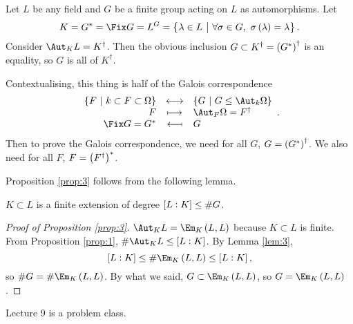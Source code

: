 \begin{proposition}
\label{prop:3}
Let $ L $ be any field and $ G $ be a finite group acting on $ L $ as automorphisms. Let
$$ K = G^* = \Fix G = L^G = \cbr{\lambda \in L \st \forall \sigma \in G, \ \sigma\br{\lambda} = \lambda}. $$
Consider $ \Aut_K L = K^\dagger $. Then the obvious inclusion $ G \subset K^\dagger = \br{G^*}^\dagger $ is an equality, so $ G $ is all of $ K^\dagger $.
\end{proposition}

\begin{remark*}
Contextualising, this thing is half of the Galois correspondence
$$ \bijection{\cbr{F \st k \subset F \subset \Omega}}{\cbr{G \st G \le \Aut_k \Omega}}{F}{\Aut_F \Omega = F^\dagger}{\Fix G = G^*}{G}. $$
Then to prove the Galois correspondence, we need for all $ G $, $ G = \br{G^*}^\dagger $. We also need for all $ F $, $ F = \br{F^\dagger}^* $.
\end{remark*}

Proposition \ref{prop:3} follows from the following lemma.

\begin{lemma}
\label{lem:3}
$ K \subset L $ is a finite extension of degree $ \sbr{L : K} \le \#G $.
\end{lemma}

\begin{proof}[Proof of Proposition \ref{prop:3}]
$ \Aut_K L = \Em_K\br{L, L} $ because $ K \subset L $ is finite. From Proposition \ref{prop:1}, $ \#\Aut_K L \le \sbr{L : K} $. By Lemma \ref{lem:3},
$$ \sbr{L : K} \le \#\Em_K\br{L, L} \le \sbr{L : K}, $$
so $ \#G = \#\Em_K\br{L, L} $. By what we said, $ G \subset \Em_K\br{L, L} $, so $ G = \Em_K\br{L, L} $.
\end{proof}


Lecture 9 is a problem class.

\pagebreak


